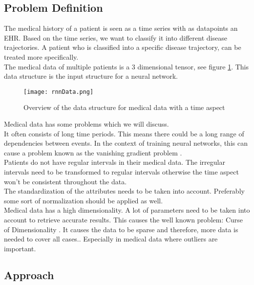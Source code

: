 \subsection{Problem Definition}

The medical history of a patient is seen as a time series with as datapoints an EHR. Based on the time series, we want to classify it into different disease trajectories. A patient who is classified into a specific disease trajectory, can be treated more specifically. \\

The medical data of multiple patients is a $3$ dimensional tensor, see figure \ref{fig:rnnData}. This data structure is the input structure for a neural network.

\begin{figure}[H]
	\centering
	\texttt{[image: rnnData.png]}
	\caption{Overview of the data structure for medical data with a time aspect \cite{dl4jRnn:online}}
	\label{fig:rnnData}
\end{figure} 

Medical data has some problems which we will discuss.\\
It often consists of long time periods. This means there could be a long range of dependencies between events. In the context of training neural networks, this can cause a problem known as the vanishing gradient problem \cite{vanishingproblem:article}. \\
Patients do not have regular intervals in their medical data. The irregular intervals need to be transformed to regular intervals otherwise the time aspect won't be consistent throughout the data. \\
The standardization of the attributes needs to be taken into account. Preferably some sort of normalization should be applied as well. \\
Medical data has a high dimensionality. A lot of parameters need to be taken into account to retrieve accurate results. This causes the well known problem: Curse of Dimensionality \cite {curseofdim:book}. It causes the data to be sparse and therefore, more data is needed to cover all cases.. Especially in medical data where outliers are important. 


\subsection{Approach}

